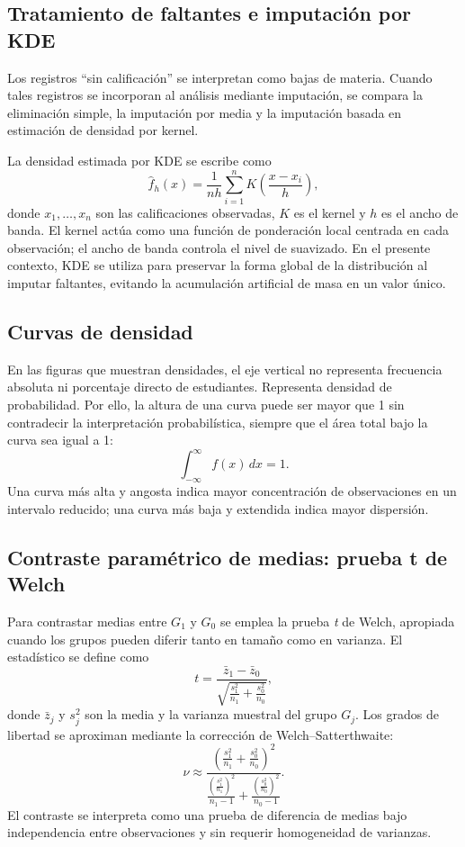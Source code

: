 \documentclass[8pt,a4paper]{article} %
\numberwithin{figure}{subsection}
\begin{document}
\subsection{Tratamiento de faltantes e imputación por KDE}
Los registros ``sin calificación'' se interpretan como bajas de materia. Cuando tales registros se incorporan al análisis mediante imputación, se compara la eliminación simple, la imputación por media y la imputación basada en estimación de densidad por kernel.

La densidad estimada por KDE se escribe como
\[
\hat f_h(x)=\frac{1}{nh}\sum_{i=1}^{n}K\!\left(\frac{x-x_i}{h}\right),
\]
donde $x_1,\dots,x_n$ son las calificaciones observadas, $K$ es el kernel y $h$ es el ancho de banda. El kernel actúa como una función de ponderación local centrada en cada observación; el ancho de banda controla el nivel de suavizado. En el presente contexto, KDE se utiliza para preservar la forma global de la distribución al imputar faltantes, evitando la acumulación artificial de masa en un valor único.

\subsection{Curvas de densidad}
En las figuras que muestran densidades, el eje vertical no representa frecuencia absoluta ni porcentaje directo de estudiantes. Representa densidad de probabilidad. Por ello, la altura de una curva puede ser mayor que 1 sin contradecir la interpretación probabilística, siempre que el área total bajo la curva sea igual a 1:
\[
\int_{-\infty}^{\infty} f(x)\,dx = 1.
\]
Una curva más alta y angosta indica mayor concentración de observaciones en un intervalo reducido; una curva más baja y extendida indica mayor dispersión.

\subsection{Contraste paramétrico de medias: prueba t de Welch}
Para contrastar medias entre $G_1$ y $G_0$ se emplea la prueba \textit{t} de Welch, apropiada cuando los grupos pueden diferir tanto en tamaño como en varianza. El estadístico se define como
\[
t=\frac{\bar z_1-\bar z_0}{\sqrt{\frac{s_1^2}{n_1}+\frac{s_0^2}{n_0}}},
\]
donde $\bar z_j$ y $s_j^2$ son la media y la varianza muestral del grupo $G_j$. Los grados de libertad se aproximan mediante la corrección de Welch--Satterthwaite:
\[
\nu \approx
\frac{\left(\frac{s_1^2}{n_1}+\frac{s_0^2}{n_0}\right)^2}
{\frac{\left(\frac{s_1^2}{n_1}\right)^2}{n_1-1}+\frac{\left(\frac{s_0^2}{n_0}\right)^2}{n_0-1}}.
\]
El contraste se interpreta como una prueba de diferencia de medias bajo independencia entre observaciones y sin requerir homogeneidad de varianzas.
\end{document}
